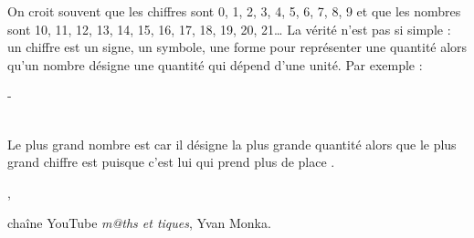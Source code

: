 \vspace*{-3mm}
\begin{changemargin}{-10mm}{-10mm}

\begin{debat}
    On croit souvent que les chiffres sont 0, 1, 2, 3, 4, 5, 6, 7, 8, 9 et que les nombres sont 10, 11, 12, 13, 14, 15, 16, 17, 18, 19, 20, 21\dots{} La vérité n'est pas si simple : un chiffre est un signe, un symbole, une forme pour représenter une quantité alors qu'un nombre désigne une quantité qui dépend d'une unité. Par exemple : \\ [5mm]
    \centerline{\textcolor{B1}{\fontsize{30}{30} \; - \; \fontsize{60}{60}}} \\ [5mm]
    Le plus grand nombre est  \fg{} car il désigne la plus grande quantité alors que le plus grand chiffre est  \fg{} puisque c'est lui qui prend \og plus de place \fg.
    \bigskip
    \begin{cadre}[B2][F4]
       \begin{center}
          ,
          
          chaîne YouTube {\it m@ths et tiques}, Yvan Monka.
       \end{center}
    \end{cadre}
 \end{debat}
\end{changemargin}